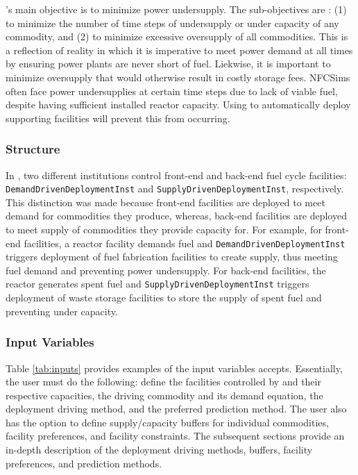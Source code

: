 \deploy's main objective is to minimize power undersupply. 
The sub-objectives are : (1) to minimize the number of time 
steps of undersupply or under capacity of any 
commodity, and (2) to minimize excessive oversupply of all commodities.
This is a reflection of reality in which it is imperative to meet 
power demand at all times by ensuring power 
plants are never short of fuel. 
Liekwise, it is important to minimize oversupply that would otherwise 
result in costly storage fees. 
\glspl{NFCSim} often face power undersupplies at certain time steps 
due to lack of viable fuel, despite having sufficient installed 
reactor capacity.  
Using \deploy to automatically deploy supporting facilities 
will prevent this from occurring.  

\subsubsection{\textbf{Structure}}
In \deploy, two different institutions control 
front-end and back-end fuel cycle facilities: 
\texttt{DemandDrivenDeploymentInst} and 
\texttt{SupplyDrivenDeploymentInst}, respectively. 
This distinction was made because front-end facilities 
are deployed to meet demand for commodities they produce, 
whereas, back-end facilities are deployed to meet supply of 
commodities they provide capacity for. 
For example, for front-end facilities, a reactor facility 
demands fuel and \texttt{DemandDrivenDeploymentInst} 
triggers deployment of fuel fabrication facilities to create 
supply, thus meeting fuel demand and preventing power undersupply. 
For back-end facilities, the reactor generates spent fuel and 
\texttt{SupplyDrivenDeploymentInst} triggers deployment of 
waste storage facilities to store the supply 
of spent fuel and preventing under capacity. 

\subsubsection{\textbf{Input Variables}}
Table \ref{tab:inputs} provides examples of the input 
variables \deploy accepts. 
Essentially, the user must do the following: 
define the facilities controlled by \deploy and their respective 
capacities, the driving commodity and 
its demand equation, the deployment driving method, and the 
preferred prediction method. 
The user also has the option to define supply/capacity buffers 
for individual commodities, facility preferences, and facility 
constraints. 
The subsequent sections provide an 
in-depth description of the deployment driving methods, buffers, 
facility preferences, and prediction methods. 

